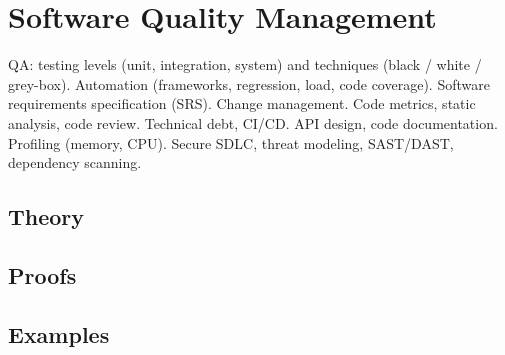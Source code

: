 
\section{Software Quality Management}
\label{sec:2.3b.13-quality-assurance}

\begin{ticket}
QA: testing levels (unit, integration, system) and techniques (black / white / grey-box). Automation (frameworks, regression, load, code coverage). Software requirements specification (SRS). Change management. Code metrics, static analysis, code review. Technical debt, CI/CD. API design, code documentation. Profiling (memory, CPU). Secure SDLC, threat modeling, SAST/DAST, dependency scanning.
\end{ticket}

\subsection*{Theory}

\subsection*{Proofs}

\subsection*{Examples}
